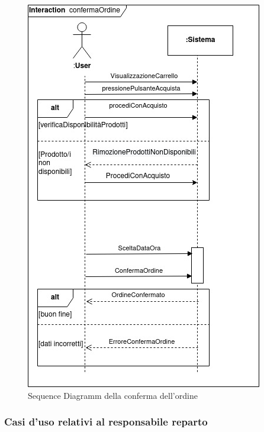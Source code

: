 \documentclass{article}
\begin{document}
\begin{figure}[h!]
	\centering
	\includegraphics[width=\textwidth]{SDConfermaOrdine.jpg}
	\caption{Sequence Diagramm della conferma dell'ordine}
	\label{fig:SDConfermaOrdine}
\end{figure}
\newpage
\clearpage
\subsubsection{Casi d'uso relativi al responsabile reparto}
\end{document}
